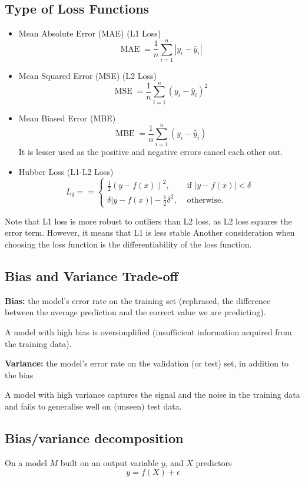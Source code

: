 \documentclass[12pt,a4paper]{article}
\begin{document}
\subsection{Type of Loss Functions}
\begin{itemize}
    \item Mean Absolute Error (MAE) (L1 Loss)
    $$
    \operatorname{MAE}=\frac{1}{n} \sum_{i=1}^n\left|y_i-\hat{y}_i\right|
    $$
    \item Mean Squared Error (MSE) (L2 Loss)
    $$
    \operatorname{MSE}=\frac{1}{n} \sum_{i=1}^n\left(y_i-\hat{y}_i\right)^2
    $$
    \item Mean Biased Error (MBE)
    $$
    \operatorname{MBE}=\frac{1}{n} \sum_{i=1}^n\left(y_i-\hat{y}_i\right)
    $$
    It is lesser used as the positive and negative errors cancel each other out.
    \item Hubber Loss (L1-L2 Loss)
    $$L_\delta== \begin{cases}\frac{1}{2}(y-f(x))^2, & \text { if }|y-f(x)|<\delta \\ \delta|y-f(x)|-\frac{1}{2} \delta^2, & \text { otherwise. }\end{cases}$$
\end{itemize}
Note that L1 loss is more robust to outliers than L2 loss, as L2 loss squares the error term.
However, it means that L1 is less stable 
Another consideration when choosing the loss function is the differentiability of the loss function. 
\subsection{Bias and Variance Trade-off}
\textbf{Bias:} the model's error rate on the training set (rephrased, the difference between the average prediction and the correct value we are predicting).

A model with high bias is oversimplified (insufficient information acquired from the training data).

\textbf{Variance: }the model's error rate on the validation (or test) set, in addition to the bias

A model with high variance captures the signal and the noise in the training data and fails to generalise well on (unseen) test data.

\subsection{Bias/variance decomposition}

On a model $M$ built on an output variable $y$, and $X$ predictors
\begin{equation*}
y=f(X)+\epsilon
\end{equation*}
\end{document}
